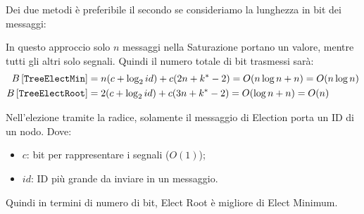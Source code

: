Dei due metodi è preferibile il secondo se consideriamo la lunghezza in bit dei
messaggi:

In questo approccio solo $n$ messaggi nella Saturazione portano un valore, mentre
tutti gli altri solo segnali. Quindi il numero totale di bit trasmessi sarà:
\begin{equation*}
    \begin{split}
        B\left[\text{\texttt{TreeElectMin}}\right] & = n (c + \log_2 id) + c (2n + k^* - 2) = O(n \log n + n) = O(n \log n)\\
        B\left[\text{\texttt{TreeElectRoot}}\right] & = 2(c + \log_2 id) + c(3n + k^* - 2) = O(\log n + n) = O(n)
    \end{split}
\end{equation*}

Nell'elezione tramite la radice, solamente il messaggio di Election porta un ID
di un nodo. Dove:
\begin{itemize}
    \item $c$: bit per rappresentare i segnali ($O(1)$);
    \item $id$: ID più grande da inviare in un messaggio.
\end{itemize}
Quindi in termini di numero di bit, Elect Root è migliore di Elect Minimum.

